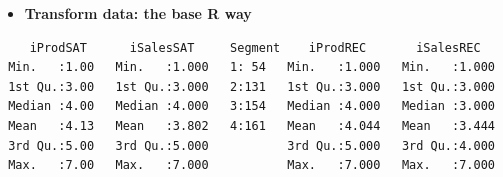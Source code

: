 \documentclass[
  ignorenonframetext,
]{beamer}
\newenvironment{Shaded}{\begin{snugshade}}{\end{snugshade}}
\newcommand{\AttributeTok}[1]{\textcolor[rgb]{0.40,0.45,0.13}{#1}}
\newcommand{\ConstantTok}[1]{\textcolor[rgb]{0.56,0.35,0.01}{#1}}
\newcommand{\FunctionTok}[1]{\textcolor[rgb]{0.28,0.35,0.67}{#1}}
\newcommand{\NormalTok}[1]{\textcolor[rgb]{0.00,0.23,0.31}{#1}}
\newcommand{\OtherTok}[1]{\textcolor[rgb]{0.00,0.23,0.31}{#1}}
\newcommand{\SpecialCharTok}[1]{\textcolor[rgb]{0.37,0.37,0.37}{#1}}
\providecommand{\tightlist}{%
  \setlength{\itemsep}{0pt}\setlength{\parskip}{0pt}}\usepackage{longtable,booktabs,array}
\begin{document}
\begin{frame}[fragile]{}
\label{section-5}
\begin{itemize}
\tightlist
\item
  \textbf{Transform data: the base R way}
\end{itemize}

\tiny

\begin{Shaded}
\end{Shaded}

\begin{verbatim}
    iProdSAT      iSalesSAT     Segment    iProdREC       iSalesREC    
 Min.   :1.00   Min.   :1.000   1: 54   Min.   :1.000   Min.   :1.000  
 1st Qu.:3.00   1st Qu.:3.000   2:131   1st Qu.:3.000   1st Qu.:3.000  
 Median :4.00   Median :4.000   3:154   Median :4.000   Median :3.000  
 Mean   :4.13   Mean   :3.802   4:161   Mean   :4.044   Mean   :3.444  
 3rd Qu.:5.00   3rd Qu.:5.000           3rd Qu.:5.000   3rd Qu.:4.000  
 Max.   :7.00   Max.   :7.000           Max.   :7.000   Max.   :7.000  
\end{verbatim}
\end{frame}
\end{document}

